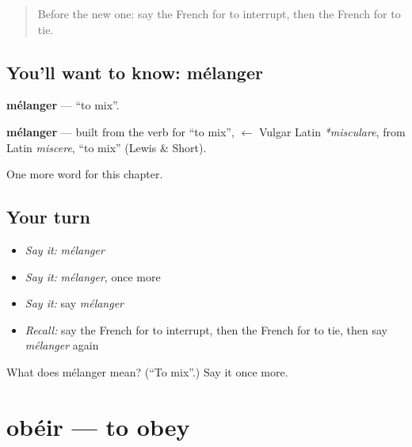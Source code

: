 \label{lesson:FR-C240-melanger}



\begin{quote}
Before the new one: say the French for to interrupt, then the French for to tie.
\end{quote}

\subsection*{You'll want to know: mélanger}
\textbf{mélanger} — \textquotedblleft{}to mix\textquotedblright{}.

\begin{cousinweb}
\textbf{mélanger} — built from the verb for \textquotedblleft{}to mix\textquotedblright{}, $\leftarrow$ Vulgar Latin \emph{*misculare}, from Latin \emph{miscere}, \textquotedblleft{}to mix\textquotedblright{} (Lewis \& Short).
\end{cousinweb}

\begin{grammarlens}[title={What you've built}]
One more word for this chapter.
\end{grammarlens}

\subsection*{Your turn}
\begin{itemize}
\raggedright
  \item \emph{Say it:} \emph{mélanger}
  \item \emph{Say it:} \emph{mélanger}, once more
  \item \emph{Say it:} say \emph{mélanger}
  \item \emph{Recall:} say the French for to interrupt, then the French for to tie, then say \emph{mélanger} again
\end{itemize}

\begin{tcolorbox}[breakable,colback=teal!4,colframe=teal!35!black,title={Before you move on}]
What does mélanger mean? (\textquotedblleft{}To mix\textquotedblright{}.) Say it once more.
\end{tcolorbox}
\section[obéir]{obéir — to obey}

\label{lesson:FR-C240-obeir}



